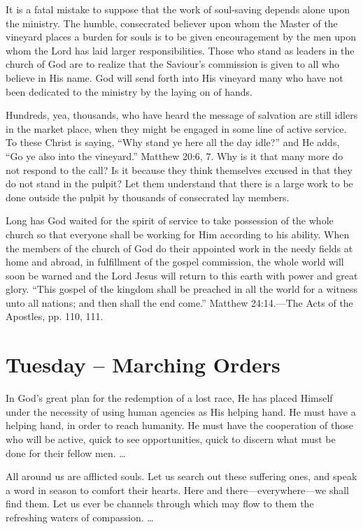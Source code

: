 \documentclass[a4paper, 10pt, twoside, headings=small]{scrartcl}
\begin{document}
\begin{multicols}{2}
It is a fatal mistake to suppose that the work of soul-saving depends alone upon the ministry. The humble, consecrated believer upon whom the Master of the vineyard places a burden for souls is to be given encouragement by the men upon whom the Lord has laid larger responsibilities. Those who stand as leaders in the church of God are to realize that the Saviour’s commission is given to all who believe in His name. God will send forth into His vineyard many who have not been dedicated to the ministry by the laying on of hands.

Hundreds, yea, thousands, who have heard the message of salvation are still idlers in the market place, when they might be engaged in some line of active service. To these Christ is saying, “Why stand ye here all the day idle?” and He adds, “Go ye also into the vineyard.” Matthew 20:6, 7. Why is it that many more do not respond to the call? Is it because they think themselves excused in that they do not stand in the pulpit? Let them understand that there is a large work to be done outside the pulpit by thousands of consecrated lay members.

Long has God waited for the spirit of service to take possession of the whole church so that everyone shall be working for Him according to his ability. When the members of the church of God do their appointed work in the needy fields at home and abroad, in fulfillment of the gospel commission, the whole world will soon be warned and the Lord Jesus will return to this earth with power and great glory. “This gospel of the kingdom shall be preached in all the world for a witness unto all nations; and then shall the end come.” Matthew 24:14.—The Acts of the Apostles, pp. 110, 111.

\section*{Tuesday – Marching Orders}

In God’s great plan for the redemption of a lost race, He has placed Himself under the necessity of using human agencies as His helping hand. He must have a helping hand, in order to reach humanity. He must have the cooperation of those who will be active, quick to see opportunities, quick to discern what must be done for their fellow men. …

All around us are afflicted souls. Let us search out these suffering ones, and speak a word in season to comfort their hearts. Here and there—everywhere—we shall find them. Let us ever be channels through which may flow to them the refreshing waters of compassion. …


\end{multicols}
\end{document}
